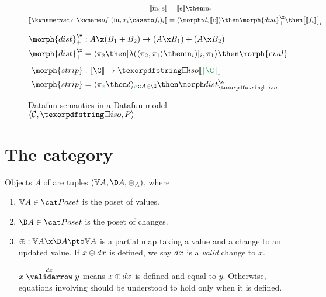 \documentclass{rntz}\usepackage{fantasy}%
\begin{document}
\begin{figure*}
  \begin{align*}
    \den{\inj i e} &= \den{e} \then \injc_i
    \\
    \den{\ecase{e} (\inj i{x_i} \caseto f_i)_i} &=
    \fork{\id, \den{e}} \then \morph{dist}^\x_+ \then \bigkrof{\den{f_i}}_i
  \end{align*}

  \vspace{.5\baselineskip}

  \begin{align*}
    \morph{dist}^\x_+ &: A \x (B_1 + B_2) \to (A \x B_1) + (A \x B_2)\\
    \morph{dist}^\x_+ &= \fork{\pi_2 \then \krof{\lambda (\fork{\pi_2,\pi_1} \then \injc_i)}_i, \pi_1}
    \then \morph{eval}
    \\[1ex]
    \morph{strip} &: \den\G \to \discof{\den{\stripcxd\G}}\\
    \morph{strip} &= \fork{\pi_{\dvar x} \then \delta}_{\hd x A \in \G} \then \discox
  \end{align*}


  \caption{Datafun semantics in a Datafun model $\tuple{\catC, \disco, \pfin}$}
  \label{fig:general-semantics}
\end{figure*}


\section{The category \CP}
\label{sec:changeposets}

Objects $A$ of \CP{} are tuples $(\vals A, \chgs A, \updfn_A)$, where
%
\begin{enumerate}
\item $\vals A \in \Poset$ is the poset of values.

\item $\chgs A \in \Poset$ is the poset of changes.

\item $\updfn : \vals A \x \chgs A \pto \vals A$ is a partial map taking a value
  and a change to an updated value. If $x \mathbin{\oplus} dx$ is defined, we say $dx$ is a
  \emph{valid} change to $x$.

  $\vld{\dx} x y$ means $x \mathbin{\oplus} dx$ is defined and equal to $y$. Otherwise,
  equations inv\-olv\-ing \updfn{} should be understood to hold only when it is
  defined.
\end{enumerate}
\end{document}

